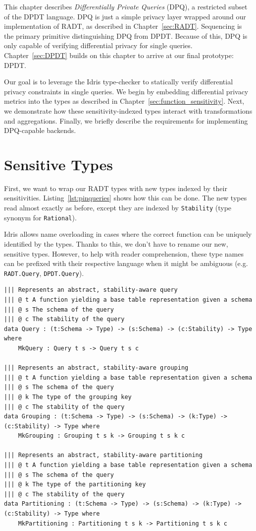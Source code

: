 \documentclass[12pt]{report}
\begin{document}
This chapter describes \textit{Differentially Private Queries} (DPQ), a restricted subset of the DPDT language.
DPQ is just a simple privacy layer wrapped around our implementation of RADT, as described in Chapter~\ref{sec:RADT}.
Sequencing is the primary primitive distinguishing DPQ from DPDT.
Because of this, DPQ is only capable of verifying differential privacy for single queries.
Chapter~\ref{sec:DPDT} builds on this chapter to arrive at our final prototype: DPDT.

Our goal is to leverage the Idris type-checker to statically verify differential privacy constraints in single queries.
We begin by embedding differential privacy metrics into the types as described in Chapter~\ref{sec:function_sensitivity}.
Next, we demonstrate how these sensitivity-indexed types interact with transformations and aggregations.
Finally, we briefly describe the requirements for implementing DPQ-capable backends.

\section{Sensitive Types}

First, we want to wrap our RADT types with new types indexed by their sensitivities.
Listing~\ref{lst:pinqueries} shows how this can be done.
The new types read almost exactly as before, except they are indexed by \texttt{Stability} (type synonym for \texttt{Rational}).

Idris allows name overloading in cases where the correct function can be uniquely identified by the types.
Thanks to this, we don't have to rename our new, sensitive types.
However, to help with reader comprehension, these type names can be prefixed with their respective language when it might be ambiguous (e.g. \texttt{RADT.Query}, \texttt{DPDT.Query}).

\begin{lstlisting}[float,caption={Representing privacy-aware queries},label={lst:pinqueries}]
||| Represents an abstract, stability-aware query
||| @ t A function yielding a base table representation given a schema
||| @ s The schema of the query
||| @ c The stability of the query
data Query : (t:Schema -> Type) -> (s:Schema) -> (c:Stability) -> Type where
    MkQuery : Query t s -> Query t s c

||| Represents an abstract, stability-aware grouping
||| @ t A function yielding a base table representation given a schema
||| @ s The schema of the query
||| @ k The type of the grouping key
||| @ c The stability of the query
data Grouping : (t:Schema -> Type) -> (s:Schema) -> (k:Type) -> (c:Stability) -> Type where
    MkGrouping : Grouping t s k -> Grouping t s k c

||| Represents an abstract, stability-aware partitioning
||| @ t A function yielding a base table representation given a schema
||| @ s The schema of the query
||| @ k The type of the partitioning key
||| @ c The stability of the query
data Partitioning : (t:Schema -> Type) -> (s:Schema) -> (k:Type) -> (c:Stability) -> Type where
    MkPartitioning : Partitioning t s k -> Partitioning t s k c
\end{lstlisting}
\end{document}
